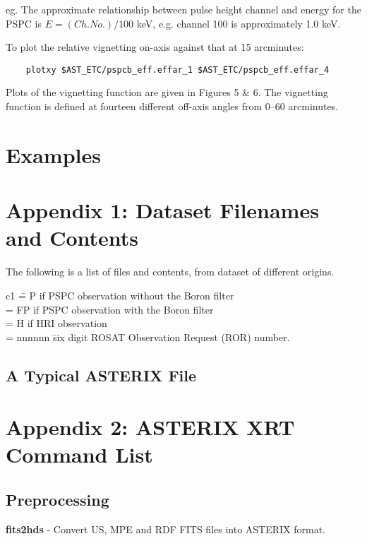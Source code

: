 \documentclass[11pt,fleqn]{article}    %
\begin{document}
eg. The approximate relationship between pulse height channel and energy
for the PSPC is $E=(Ch.No.) / 100$ keV, e.g. channel 100 is approximately 
1.0 keV.

To plot the relative vignetting on-axis against that at 15 arcminutes:

\begin{verbatim}
    plotxy $AST_ETC/pspcb_eff.effar_1 $AST_ETC/pspcb_eff.effar_4
\end{verbatim}

Plots  of the   vignetting function  are  given in  Figures 5   \&  6.  The
vignetting  function is defined  at fourteen different off-axis angles from
0--60 arcminutes.

\newpage
\section{Examples}


\newpage
\section{Appendix 1: Dataset Filenames and Contents}

The following is a list of files and contents, from dataset of different
origins.

\begin{tabbing}
c1 \= = P if PSPC observation without the Boron filter \\
\> = FP if PSPC observation with the Boron filter \\
\> = H if HRI observation \\
\> = nnnnnn \= six digit ROSAT Observation Request (ROR) number.
\end{tabbing}


\newpage
\subsection{A Typical ASTERIX File}


\newpage
\section{Appendix 2: ASTERIX XRT Command List}

\subsection{Preprocessing}
{\large \bf{fits2hds}} - Convert US, MPE and RDF FITS files into ASTERIX
format.\\
\end{document}
